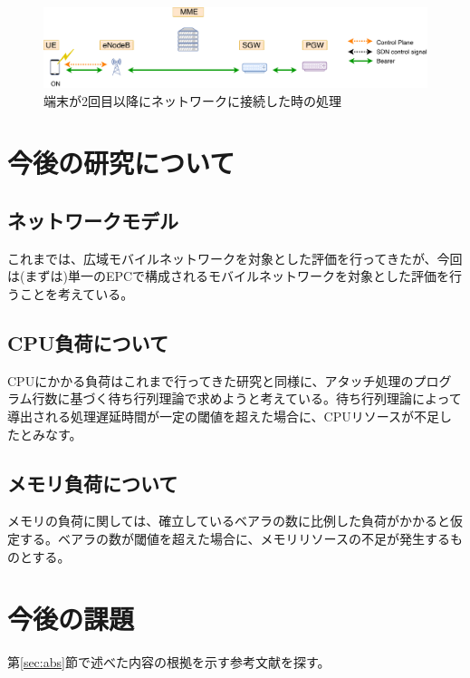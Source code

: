 \documentclass[a4j]{ujarticle}
\begin{document}
\begin{figure}[htbp]
	\centering
	\includegraphics[width=0.7\hsize]{detach-reON.pdf}
  \caption{端末が2回目以降にネットワークに接続した時の処理}
	\label{detach-reON}
\end{figure}

\section{今後の研究について}
\subsection{ネットワークモデル}
これまでは、広域モバイルネットワークを対象とした評価を行ってきたが、今回は(まずは)単一のEPCで構成されるモバイルネットワークを対象とした評価を行うことを考えている。
\subsection{CPU負荷について}
CPUにかかる負荷はこれまで行ってきた研究と同様に、アタッチ処理のプログラム行数に基づく待ち行列理論で求めようと考えている。待ち行列理論によって導出される処理遅延時間が一定の閾値を超えた場合に、CPUリソースが不足したとみなす。
\subsection{メモリ負荷について}
メモリの負荷に関しては、確立しているベアラの数に比例した負荷がかかると仮定する。ベアラの数が閾値を超えた場合に、メモリリソースの不足が発生するものとする。
\section{今後の課題}
第\ref{sec:abs}節で述べた内容の根拠を示す参考文献を探す。
% 
% 
\end{document}
